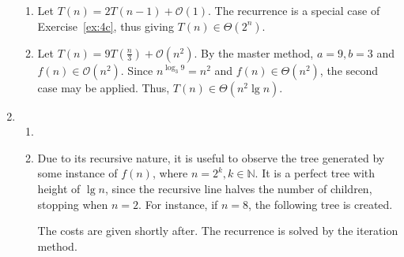 \documentclass[12pt]{article}
\begin{document}
\begin{enumerate}
\begin{enumerate}
        \item Let $T(n) = 2T(n - 1) + \mathcal{O}(1)$. The recurrence is a special case of Exercise~\ref{ex:4c}, thus giving $T(n) \in \Theta(2^{n})$.
        \item Let $T(n) = 9T(\frac{n}{3}) + \mathcal{O}(n^{2})$. By the master method, $a = 9, b = 3$ and $f(n) \in \mathcal{O}(n^{2})$. Since $n^{\log_{3} 9} = n^{2}$ and $f(n) \in \Theta(n^{2})$, the second case may be applied. Thus, $T(n) \in \Theta(n^{2} \lg n)$.
    \end{enumerate}
    \item
    \begin{enumerate}
        \item 
        \item Due to its recursive nature, it is useful to observe the tree generated by some instance of $f(n)$, where $n = 2^{k}, k \in \mathbb{N}$. It is a perfect tree with height of $\lg n$, since the recursive line halves the number of children, stopping when $n = 2$. For instance, if $n = 8$, the following tree is created.
        \begin{figure}[htbp]
          \centering
        \end{figure}
        The costs are given shortly after. The recurrence is solved by the iteration method.

\end{enumerate}
\end{enumerate}
\end{document}
